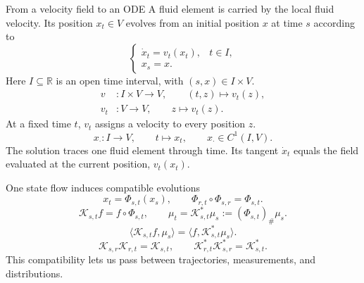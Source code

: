 \begin{frame}[t]{From a velocity field to an ODE}
\hypertarget{main:ode}{}
\fontsize{9}{11}\selectfont
A fluid element is carried by the local fluid velocity. Its position $x_t\in V$
evolves from an initial position $x$ at time $s$ according to
\begin{equation*}
  \begin{cases}
    \dot x_t=v_t(x_t),&t\in I,\\
    x_s=x.
  \end{cases}
\end{equation*}
Here $I\subseteq\mathbb R$ is an open time interval, with $(s,x)\in I\times V$.
\begin{equation*}
  \begin{aligned}
    v &: I\times V\longrightarrow V,\qquad (t,z)\longmapsto v_t(z),\\
    v_t &: V\longrightarrow V,\qquad z\longmapsto v_t(z).
  \end{aligned}
\end{equation*}
At a fixed time $t$, $v_t$ assigns a velocity to every position $z$.
\begin{equation*}
  x_{\cdot}:I\longrightarrow V,\qquad t\longmapsto x_t,
  \qquad x_{\cdot}\in C^1(I,V).
\end{equation*}
The solution traces one fluid element through time. Its tangent $\dot x_t$
equals the field evaluated at the current position, $v_t(x_t)$.
\end{frame}

\begin{frame}[t]{One state flow induces compatible evolutions}
\hypertarget{main:induced}{}
\begin{equation*}
  x_t=\Phi_{s,t}(x_s),\qquad \Phi_{r,t}\circ\Phi_{s,r}=\Phi_{s,t}.
\end{equation*}
\begin{equation*}
  \mathcal K_{s,t}f=f\circ\Phi_{s,t},\qquad
  \mu_t=\mathcal K_{s,t}^*\mu_s:=(\Phi_{s,t})_\#\mu_s.
\end{equation*}
\begin{equation*}
  \boxed{\langle\mathcal K_{s,t}f,\mu_s\rangle=\langle f,\mathcal K_{s,t}^*\mu_s\rangle.}
\end{equation*}
\begin{equation*}
  \mathcal K_{s,r}\mathcal K_{r,t}=\mathcal K_{s,t},\qquad
  \mathcal K_{r,t}^*\mathcal K_{s,r}^*=\mathcal K_{s,t}^*.
\end{equation*}
This compatibility lets us pass between trajectories, measurements, and distributions.
\end{frame}
